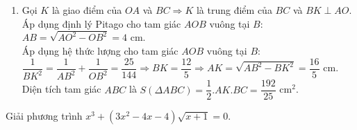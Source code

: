 \begin{ex}
{\begin{enumerate}
Vì $I$ là điểm chính giữa cung $\wideparen{BC}$ và $AB$ là tiếp tuyến của $(O)$ nên $\widehat{ABI}=\dfrac{1}{2}\mbox{sđ}\wideparen{BC}$ (4).\\
Từ (3) và (4) ta suy ra $BI$ là tia phân giác $\widehat{ABC}$, do vậy $I$ là tâm đường tròn nội tiếp tam giác $ABC$. 
\item Gọi $K$ là giao điểm của $OA$ và $BC\Rightarrow K$ là trung điểm của $BC$ và $BK\perp AO$.\\
Áp dụng định lý Pitago cho tam giác $AOB$ vuông tại $B$: $AB=\sqrt{AO^{2}-OB^{2}}=4$ cm.\\
Áp dụng hệ thức lượng cho tam giác $AOB$ vuông tại $B$:\\
$\dfrac{1}{BK^{2}}=\dfrac{1}{AB^{2}}+\dfrac{1}{OB^{2}}=\dfrac{25}{144}\Rightarrow BK=\dfrac{12}{5}\Rightarrow AK=\sqrt{AB^{2}-BK^{2}}=\dfrac{16}{5}$ cm.\\
Diện tích tam giác $ABC$ là $S(\Delta ABC)=\dfrac{1}{2}.AK.BC=\dfrac{192}{25}$ cm$^{2}$.
\end{enumerate}
}
\end{ex}
\begin{ex}%
Giải phương trình $x^{3}+(3x^{2}-4x-4)\sqrt{x+1}=0$.
\end{ex}
